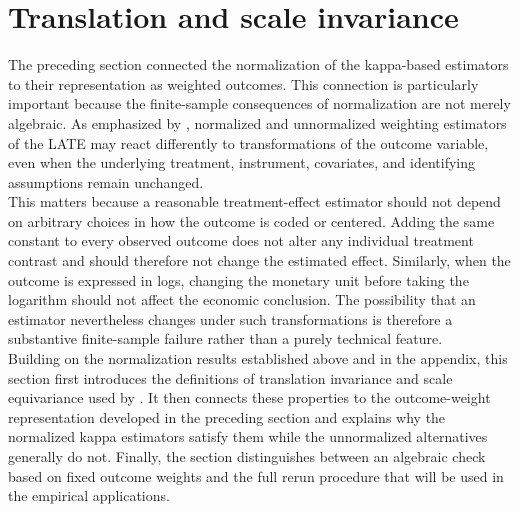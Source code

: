 \documentclass[12pt, a4paper, oneside]{article}
\theoremstyle{plain}
\theoremstyle{definition}
\begin{document}
\section{Translation and scale invariance}
\label{sec:translation_invariance}

The preceding section connected the normalization of the kappa-based estimators to
their representation as weighted outcomes. This connection is particularly important
because the finite-sample consequences of normalization are not merely algebraic.
As emphasized by \citet{sloczynski2025abadie}, normalized and unnormalized
weighting estimators of the LATE may react differently to transformations of the
outcome variable, even when the underlying treatment, instrument, covariates, and
identifying assumptions remain unchanged.\\
This matters because a reasonable treatment-effect estimator should not depend on
arbitrary choices in how the outcome is coded or centered. Adding the same constant
to every observed outcome does not alter any individual treatment contrast and should
therefore not change the estimated effect. Similarly, when the outcome is expressed in
logs, changing the monetary unit before taking the logarithm should not affect the
economic conclusion. The possibility that an estimator nevertheless changes under
such transformations is therefore a substantive finite-sample failure rather than a
purely technical feature.\\
Building on the normalization results established above and in the appendix, this
section first introduces the definitions of translation invariance and scale
equivariance used by \citet{sloczynski2025abadie}. It then connects these properties
to the outcome-weight representation developed in the preceding section and explains
why the normalized kappa estimators satisfy them while the unnormalized alternatives
generally do not. Finally, the section distinguishes between an algebraic check based
on fixed outcome weights and the full rerun procedure that will be used in the
empirical applications.
\end{document}
